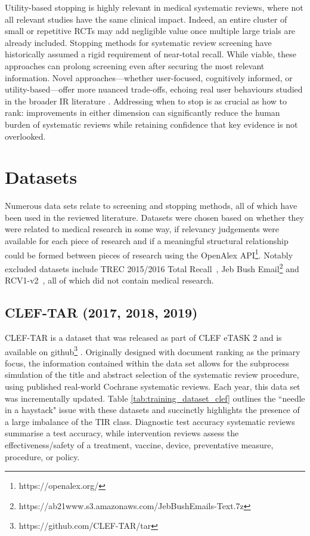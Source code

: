 \documentclass[10pt,oneside]{book}
\begin{document}
Utility-based stopping is highly relevant in medical systematic reviews, where not all relevant studies have the same clinical impact. Indeed, an entire cluster of small or repetitive RCTs may add negligible value once multiple large trials are already included. Stopping methods for systematic review screening have historically assumed a rigid requirement of near-total recall. While viable, these approaches can prolong screening even after securing the most relevant information. Novel approaches—whether user-focused, cognitively informed, or utility-based—offer more nuanced trade-offs, echoing real user behaviours studied in the broader IR literature \cite{browne_stopping_2005, ilani_analysis_2024}. Addressing when to stop is as crucial as how to rank: improvements in either dimension can significantly reduce the human burden of systematic reviews while retaining confidence that key evidence is not overlooked.

\section{Datasets}\label{sec:datasets}

Numerous data sets relate to screening and stopping methods, all of which have been used in the reviewed literature. Datasets were chosen based on whether they were related to medical research in some way, if relevancy judgements were available for each piece of research and if a meaningful structural relationship could be formed between pieces of research using the OpenAlex API\footnote{https://openalex.org/}. Notably excluded datasets include TREC 2015/2016 Total Recall~\cite{roegiest_trec_2015, grossman_trec_2016}, Jeb Bush Email\footnote{https://ab21www.s3.amazonaws.com/JebBushEmails-Text.7z} and RCV1-v2~\cite{lewis_rcv1_2004}, all of which did not contain medical research.

\subsection{CLEF-TAR (2017, 2018, 2019)}

CLEF-TAR is a dataset that was released as part of CLEF eTASK 2 and is available on github\footnote{https://github.com/CLEF-TAR/tar} \cite{kanoulas_clef_2017, kanoulas_clef_2018, kanoulas_clef_2019}. Originally designed with document ranking as the primary focus, the information contained within the data set allows for the subprocess simulation of the title and abstract selection of the systematic review procedure, using published real-world Cochrane systematic reviews. Each year, this data set was incrementally updated. Table \ref{tab:training_dataset_clef} outlines the ``needle in a haystack" issue with these datasets and succinctly highlights the presence of a large imbalance of the TIR class. Diagnostic test accuracy systematic reviews summarise a test accuracy, while intervention reviews assess the effectiveness/safety of a treatment, vaccine, device, preventative measure, procedure, or policy.
\end{document}
